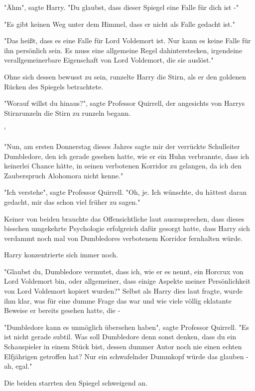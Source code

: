 {"Ähm", sagte Harry. "Du glaubst, dass dieser Spiegel eine Falle für dich ist -"

"Es gibt keinen Weg unter dem Himmel, dass er nicht als Falle gedacht ist."

"Das heißt, dass es eine Falle für Lord Voldemort ist. Nur kann es keine Falle für ihn persönlich sein. Es muss eine allgemeine Regel dahinterstecken, irgendeine verallgemeinerbare Eigenschaft von Lord Voldemort, die sie auslöst."

Ohne sich dessen bewusst zu sein, runzelte Harry die Stirn, als er den goldenen Rücken des Spiegels betrachtete.

"Worauf willst du hinaus?", sagte Professor Quirrell, der angesichts von Harrys Stirnrunzeln die Stirn zu runzeln begann.

`

"Nun, am ersten Donnerstag dieses Jahres sagte mir der verrückte Schulleiter Dumbledore, den ich gerade gesehen hatte, wie er ein Huhn verbrannte, dass ich keinerlei Chance hätte, in seinen verbotenen Korridor zu gelangen, da ich den Zauberspruch Alohomora nicht kenne."

"Ich verstehe", sagte Professor Quirrell. "Oh, je. Ich wünschte, du hättest daran gedacht, mir das schon viel früher zu sagen."

Keiner von beiden brauchte das Offensichtliche laut auszusprechen, dass dieses bisschen umgekehrte Psychologie erfolgreich dafür gesorgt hatte, dass Harry sich verdammt noch mal von Dumbledores verbotenem Korridor fernhalten würde.

Harry konzentrierte sich immer noch.

"Glaubst du, Dumbledore vermutet, dass ich, wie er es nennt, ein Horcrux von Lord Voldemort bin, oder allgemeiner, dass einige Aspekte meiner Persönlichkeit von Lord Voldemort kopiert wurden?" Selbst als Harry dies laut fragte, wurde ihm klar, was für eine dumme Frage das war und wie viele völlig eklatante Beweise er bereits gesehen hatte, die -

"Dumbledore kann es unmöglich übersehen haben", sagte Professor Quirrell. "Es ist nicht gerade subtil. Was soll Dumbledore denn sonst denken, dass du ein Schauspieler in einem Stück bist, dessen dummer Autor noch nie einen echten Elfjährigen getroffen hat? Nur ein schwafelnder Dummkopf würde das glauben - ah, egal."

Die beiden starrten den Spiegel schweigend an.

}
